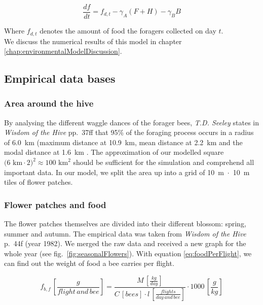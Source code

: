 			\begin{equation}\label{eq:changeFoodStoreDyn}
				\frac{df}{dt} = f_{d,t} - \gamma_A (F+H) - \gamma_B B
			\end{equation}
			
			Where $f_{d,t}$ denotes the amount of food the foragers collected on day $t$.\\
			
			We discuss the numerical results of this model in chapter \ref{chap:environmentalModelDiscussion}.
		
	\subsection{Empirical data bases}
		\label{chap:empiricalDataBases}
		\subsubsection{Area around the hive}
			\label{chap:areaAroundTheHive}
			By analysing the different waggle dances of the forager bees, \textit{T.D. Seeley} states in \textit{Wisdom of the Hive} pp.~37ff that 95\% of the foraging process occurs in a radius of 6.0~km (maximum distance at 10.9~km, mean distance at 2.2~km and the modal distance at 1.6~km \cite{seeley95}. The approximation of our modelled square $\text{(6~km}\cdot\text{2)}^2 \approx \text{100~km}^2$ should be sufficient for the simulation and comprehend all important data. In our model, we split the area up into a grid of 10~m~$\cdot$~10~m tiles of flower patches.
			
		\subsubsection{Flower patches and food}
			\label{chap:flowerPatchesAndFood}
			The flower patches themselves are divided into their different blossom: spring, summer and autumn. The empirical data was taken from \textit{Wisdom of the Hive} p.~44f (year 1982). We merged the raw data and received a new graph for the whole year (see fig.~\ref{fig:seasonalFlowers}). With equation \ref{eq:foodPerFlight}, we can find out the weight of food a bee carries per flight. 
			
			\begin{equation}\label{eq:foodPerFlight}
						f_{b,f} \,[\frac{g}{flight\, and\, bee}] = \frac{M \,[\frac{kg}{day}]}{C \,[bees] \cdot l \,[\frac{flights}{day \,and\, bee}]}\cdot 1000 \,[\frac{g}{kg}]
			\end{equation}
			
